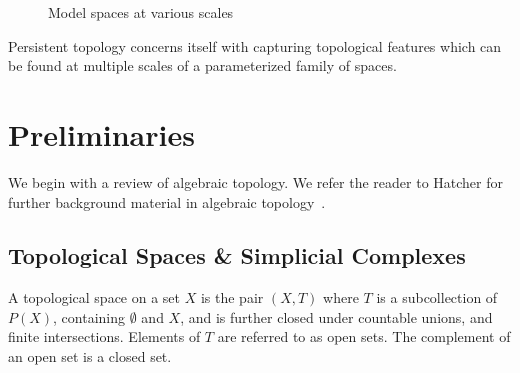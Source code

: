  \begin{figure}
\centering
 \hspace{.5cm}
 \hspace{.25cm}
 \hspace{.25cm}
\caption{Model spaces at various scales}
\end{figure}

Persistent topology concerns itself with capturing topological features which can be found at multiple scales of a parameterized family of spaces.

\section{Preliminaries}
We begin with a review of algebraic topology. We refer the reader to Hatcher for further background material in algebraic topology~\cite{hatcher}.
\subsection{Topological Spaces \& Simplicial Complexes}
A topological space on a set $X$ is the pair $(X,T)$ where $T$ is a subcollection of $P(X)$, containing $\emptyset$ and $X$, and is further 
closed under countable unions, and finite intersections. 
Elements of $T$ are referred to as open sets. The complement of an open set is a closed set.

